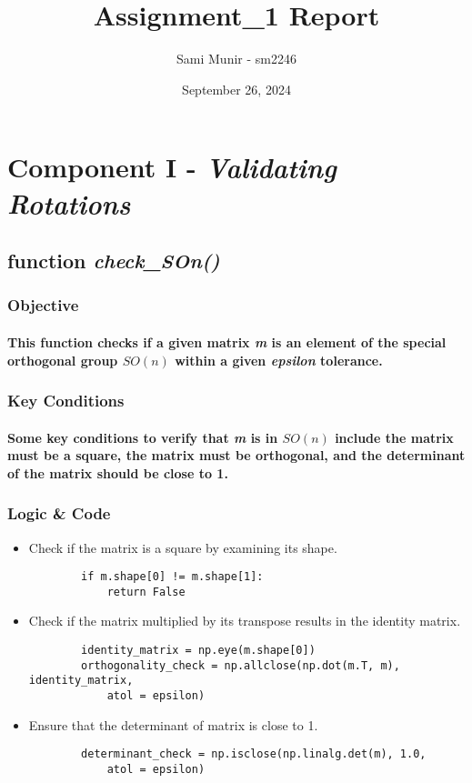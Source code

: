 \documentclass[12pt, letterpaper]{article}
\title{Assignment\_1 Report}
\author{Sami Munir - sm2246}
\date{September 26, 2024}
\begin{document}
\maketitle

\section{Component I - \textit{Validating Rotations}}
\subsection{function \textit{check\_SOn()}}
\subsubsection{Objective}
\paragraph{This function checks if a given matrix \textit{m} is an element of the special orthogonal group $SO(n)$ within a given \textit{epsilon} tolerance.}
\subsubsection{Key Conditions}
\paragraph{Some key conditions to verify that \textit{m} is in $SO(n)$ include the matrix must be a square, the matrix must be orthogonal, and the determinant of the matrix should be close to 1.}
\subsubsection{Logic \& Code}
\begin{itemize}
    \item{Check if the matrix is a square by examining its shape.}
    \begin{verbatim}
        if m.shape[0] != m.shape[1]:
            return False
    \end{verbatim}
    \item{Check if the matrix multiplied by its transpose results in the identity matrix.}
    \begin{verbatim}
        identity_matrix = np.eye(m.shape[0])
        orthogonality_check = np.allclose(np.dot(m.T, m), identity_matrix, 
            atol = epsilon)
    \end{verbatim}
    \item{Ensure that the determinant of matrix is close to 1.}
    \begin{verbatim}
        determinant_check = np.isclose(np.linalg.det(m), 1.0, 
            atol = epsilon)
    \end{verbatim}
\end{itemize}
\end{document}
